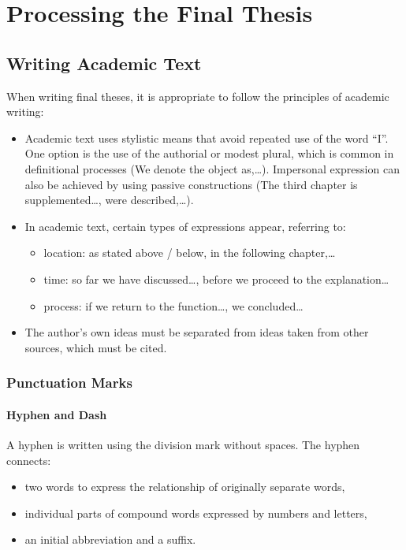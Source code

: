 \section{Processing the Final Thesis}

\subsection{Writing Academic Text}

When writing final theses, it is appropriate to follow the principles of academic writing:

\begin{itemize}
	\item Academic text uses stylistic means that avoid repeated use of the word “I”. One option is the use of the authorial or modest plural, which is common in definitional processes (We denote the object as,…). Impersonal expression can also be achieved by using passive constructions (The third chapter is supplemented…, were described,…).
	\item In academic text, certain types of expressions appear, referring to:
	\begin{itemize}
		\item location: as stated above / below, in the following chapter,…
		\item time: so far we have discussed…, before we proceed to the explanation…
		\item process: if we return to the function…, we concluded…
	\end{itemize}
	\item The author’s own ideas must be separated from ideas taken from other sources, which must be cited.
\end{itemize}

\subsubsection{Punctuation Marks}

\paragraph{Hyphen and Dash}

A hyphen is written using the division mark without spaces. The hyphen connects:

\begin{itemize}
	\item two words to express the relationship of originally separate words,
	\item individual parts of compound words expressed by numbers and letters,
	\item an initial abbreviation and a suffix.
\end{itemize}

